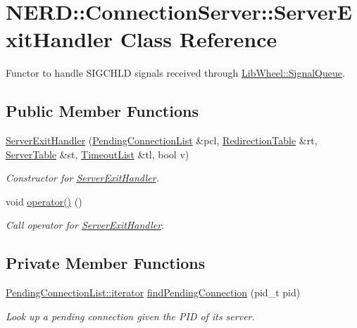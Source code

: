 \hypertarget{classNERD_1_1ConnectionServer_1_1ServerExitHandler}{
\section{\-N\-E\-R\-D\-:\-:\-Connection\-Server\-:\-:\-Server\-Exit\-Handler \-Class \-Reference}
\label{classNERD_1_1ConnectionServer_1_1ServerExitHandler}
}


\-Functor to handle \-S\-I\-G\-C\-H\-L\-D signals received through \hyperlink{classLibWheel_1_1SignalQueue}{\-Lib\-Wheel\-::\-Signal\-Queue}.  


\subsection*{\-Public \-Member \-Functions}
\begin{DoxyCompactItemize}
\item 
\hyperlink{classNERD_1_1ConnectionServer_1_1ServerExitHandler_a0a3634beb4eac3315afb6671205c399a}{\-Server\-Exit\-Handler} (\hyperlink{classNERD_1_1ConnectionServer_ac838d247f33cef856ae722343a8cb7ff}{\-Pending\-Connection\-List} \&pcl, \hyperlink{classNERD_1_1ConnectionServer_a1f7b6abdda0f0a7a027a5f2e24727cee}{\-Redirection\-Table} \&rt, \hyperlink{classNERD_1_1ConnectionServer_a0cd661f2a6755c501ac198229675ad4d}{\-Server\-Table} \&st, \hyperlink{classNERD_1_1ConnectionServer_a63d211040487b4566f2f696026723932}{\-Timeout\-List} \&tl, bool v)
\begin{DoxyCompactList}\small\item\em \-Constructor for \hyperlink{classNERD_1_1ConnectionServer_1_1ServerExitHandler}{\-Server\-Exit\-Handler}. \end{DoxyCompactList}\item 
void \hyperlink{classNERD_1_1ConnectionServer_1_1ServerExitHandler_a9ca943b524de0b1f1907cecaab2943e1}{operator()} ()
\begin{DoxyCompactList}\small\item\em \-Call operator for \hyperlink{classNERD_1_1ConnectionServer_1_1ServerExitHandler}{\-Server\-Exit\-Handler}. \end{DoxyCompactList}\end{DoxyCompactItemize}
\subsection*{\-Private \-Member \-Functions}
\begin{DoxyCompactItemize}
\item 
\hyperlink{classLibWheel_1_1WaitList_a197f2582847b549a89b833d2eb153b1c}{\-Pending\-Connection\-List\-::iterator} \hyperlink{classNERD_1_1ConnectionServer_1_1ServerExitHandler_ac380cd94aeac14ce16c7d957d999941c}{find\-Pending\-Connection} (pid\-\_\-t pid)
\begin{DoxyCompactList}\small\item\em \-Look up a pending connection given the \-P\-I\-D of its server. \end{DoxyCompactList}\end{DoxyCompactItemize}
